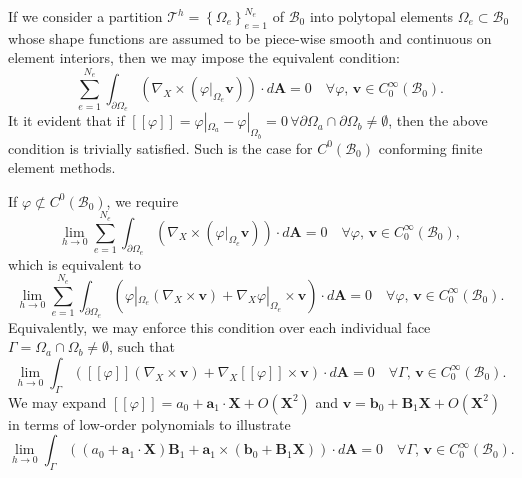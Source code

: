 If we consider a partition $\mathcal{T}^h = \left\{ \Omega_e \right\}_{e=1}^{N_e}$ of $\mathcal{B}_0$ into polytopal elements $\Omega_e \subset \mathcal{B}_0$ whose shape functions are assumed to be piece-wise smooth and continuous on element interiors, then we may impose the equivalent condition:
\begin{equation}
	\sum_{e = 1}^{N_e} \int_{\partial \Omega_e} (\nabla_X \times (\varphi|_{\Omega_e} \mathbf{v})) \cdot d\mathbf{A} = 0 \quad \forall \varphi, \, \mathbf{v} \in C^\infty_0 (\mathcal{B}_0).
\end{equation}
It it evident that if $[\![ \varphi ]\!] = \varphi|_{\Omega_a} - \varphi|_{\Omega_b} = 0 \, \forall \partial \Omega_a \cap \partial \Omega_b \neq \emptyset$, then the above condition is trivially satisfied. Such is the case for $C^0 (\mathcal{B}_0)$ conforming finite element methods.

If $\varphi \not\subset C^0 (\mathcal{B}_0)$, we require
\begin{equation}
	\lim_{h \rightarrow 0} \sum_{e = 1}^{N_e} \int_{\partial \Omega_e} (\nabla_X \times (\varphi|_{\Omega_e} \mathbf{v})) \cdot d\mathbf{A} = 0 \quad \forall \varphi, \, \mathbf{v} \in C^\infty_0 (\mathcal{B}_0),
\end{equation}
which is equivalent to
\begin{equation}
	\lim_{h \rightarrow 0} \sum_{e = 1}^{N_e} \int_{\partial \Omega_e} (\varphi|_{\Omega_e} (\nabla_X \times \mathbf{v}) + \nabla_X \varphi|_{\Omega_e} \times \mathbf{v}) \cdot d\mathbf{A} = 0 \quad \forall \varphi, \, \mathbf{v} \in C^\infty_0 (\mathcal{B}_0).
\end{equation}
Equivalently, we may enforce this condition over each individual face $\Gamma = \Omega_a \cap \Omega_b \neq \emptyset$, such that
\begin{equation}
	\lim_{h \rightarrow 0} \int_{\Gamma} ([\![ \varphi ]\!] (\nabla_X \times \mathbf{v}) + \nabla_X [\![ \varphi ]\!] \times \mathbf{v}) \cdot d\mathbf{A} = 0 \quad \forall \Gamma, \, \mathbf{v} \in C^\infty_0 (\mathcal{B}_0).
\end{equation}
We may expand $[\![ \varphi ]\!] = a_0 + \mathbf{a}_1 \cdot \mathbf{X} + O(\mathbf{X}^2)$ and $\mathbf{v} = \mathbf{b}_0 + \mathbf{B}_1 \mathbf{X} + O(\mathbf{X}^2)$ in terms of low-order polynomials to illustrate
\begin{equation}
	\lim_{h \rightarrow 0} \int_{\Gamma} ((a_0 + \mathbf{a}_1 \cdot \mathbf{X}) \mathbf{B}_1 + \mathbf{a}_1 \times (\mathbf{b}_0 + \mathbf{B}_1 \mathbf{X})) \cdot d\mathbf{A} = 0 \quad \forall \Gamma, \, \mathbf{v} \in C^\infty_0 (\mathcal{B}_0).
\end{equation}

